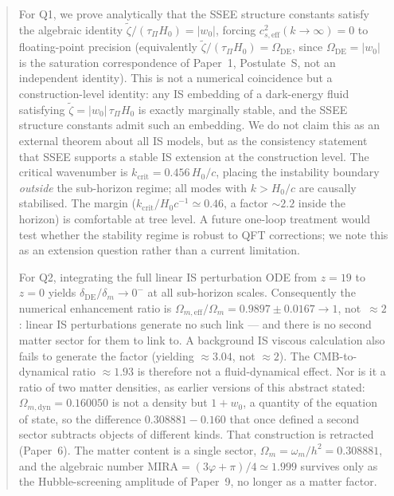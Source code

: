 \documentclass[12pt,a4paper]{article}
\newcommand{\wz}{w_0}
\newcommand{\OmDE}{\Omega_{\mathrm{DE}}}
\newcommand{\tauPi}{\tau_\Pi}
\newcommand{\ztilde}{\tilde{\zeta}}
\begin{document}
\begin{abstract}
For Q1, we prove analytically that the SSEE structure constants satisfy the
algebraic identity $\ztilde/(\tauPi H_0) = |w_0|$, forcing
$c^2_{s,\mathrm{eff}}(k\to\infty) = 0$ to floating-point precision
(equivalently $\ztilde/(\tauPi H_0) = \OmDE$, since $\OmDE = |w_0|$ is the
saturation correspondence of Paper~1, Postulate~S, not an independent identity).
This is not a numerical coincidence but a construction-level identity:
any IS embedding of a dark-energy fluid satisfying
$\ztilde = |\wz|\,\tauPi H_0$ is exactly marginally stable, and the SSEE
structure constants admit such an embedding. We do not claim this as an
external theorem about all IS models, but as the consistency statement that
SSEE supports a stable IS extension at the construction level.
The critical wavenumber is $k_\mathrm{crit} = 0.456\,H_0/c$, placing the
instability boundary \emph{outside} the sub-horizon regime;
all modes with $k > H_0/c$ are causally stabilised. The margin
($k_\mathrm{crit}/H_0 c^{-1} \simeq 0.46$, a factor $\sim 2.2$ inside the
horizon) is comfortable at tree level. A future one-loop treatment would
test whether the stability regime is robust to QFT corrections; we
note this as an extension question rather than a current limitation.

For Q2, integrating the full linear IS perturbation ODE from $z=19$ to $z=0$
yields $\delta_{\mathrm{DE}}/\delta_m \to 0^-$ at all sub-horizon scales.
Consequently the numerical enhancement ratio is
$\Omega_{m,\mathrm{eff}}/\Omega_m = 0.9897\pm 0.0167 \to 1$, not~$\approx2$:
linear IS perturbations generate no such link --- and there is no second matter
sector for them to link to.
A background IS viscous calculation also fails to generate the factor (yielding
$\approx3.04$, not $\approx2$). The CMB-to-dynamical ratio $\approx1.93$ is therefore
not a fluid-dynamical effect.  Nor is it a ratio of two matter densities, as
earlier versions of this abstract stated: $\Omega_{m,\mathrm{dyn}}=0.160050$ is
not a density but $1+w_0$, a quantity of the equation of state, so the
difference $0.308881-0.160$ that once defined a second sector subtracts
objects of different kinds.  That construction is retracted (Paper~6).  The
matter content is a single sector, $\Omega_m = \omega_m/h^2 = 0.308881$, and
the algebraic number $\mathrm{MIRA}=(3\varphi+\pi)/4\simeq1.999$ survives only
as the Hubble-screening amplitude of Paper~9, no longer as a matter factor.


\end{abstract}
\end{document}
